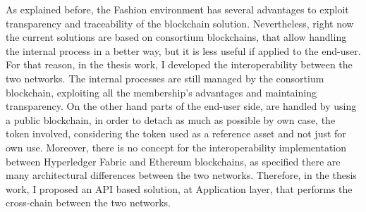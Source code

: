 As explained before, the Fashion environment has several advantages to exploit transparency and traceability of the 
blockchain solution. Nevertheless, right now the current solutions are based on consortium blockchains, that allow 
handling the internal process in a better way, but it is less useful if applied to the end-user. For that reason, in 
the thesis work, I developed the interoperability between the two networks. The internal processes are still managed 
by the consortium blockchain, exploiting all the membership's advantages and maintaining transparency. On the other 
hand parts of the end-user side, are handled by using a public blockchain, in order to detach as much as possible by own 
case, the token involved, considering the token used as a reference asset and not just for own use. Moreover, there 
is no concept for the interoperability implementation between Hyperledger Fabric and Ethereum blockchains, as specified 
there are many architectural differences between the two networks. Therefore, in the thesis work, I proposed an API 
based solution, at Application layer, that performs the cross-chain between the two networks.